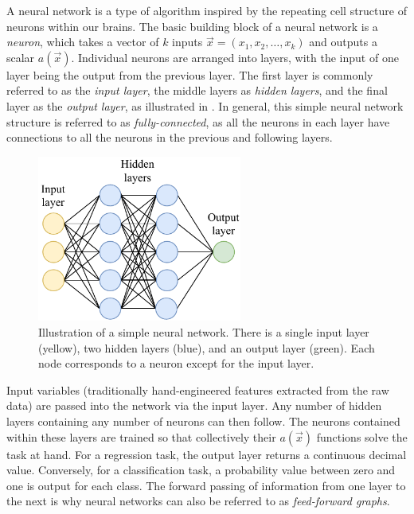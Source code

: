 A neural network is a type of algorithm inspired by the repeating cell structure of neurons within
our brains. The basic building block of a neural network is a \emph{neuron}, which takes a vector
of $k$ inputs $\vec{x}=(x_{1}, x_{2},\dots,x_{k})$ and outputs a scalar $a(\vec{x})$. Individual
neurons are arranged into layers, with the input of one layer being the output from the previous
layer. The first layer is commonly referred to as the \emph{input layer}, the middle layers as
\emph{hidden layers}, and the final layer as the \emph{output layer}, as illustrated in
. In general, this simple neural network structure is referred to as
\emph{fully-connected}, as all the neurons in each layer have connections to all the neurons in
the previous and following layers.

\begin{figure} %
    \includegraphics[width=0.6\textwidth]{diagrams/6-cnn/network.pdf}
    \caption[Illustration of a simple neural network]
    {Illustration of a simple neural network. There is a single input layer (yellow), two hidden
        layers (blue), and an output layer (green). Each node corresponds to a neuron except for
        the input layer.}
    \label{fig:network}
\end{figure}

Input variables (traditionally hand-engineered features extracted from the raw data) are passed
into the network via the input layer. Any number of hidden layers containing any number of neurons
can then follow. The neurons contained within these layers are trained so that collectively their
$a(\vec{x})$ functions solve the task at hand. For a regression task, the output layer returns a
continuous decimal value. Conversely, for a classification task, a probability value between zero
and one is output for each class. The forward passing of information from one layer to the next is
why neural networks can also be referred to as \emph{feed-forward graphs}.

